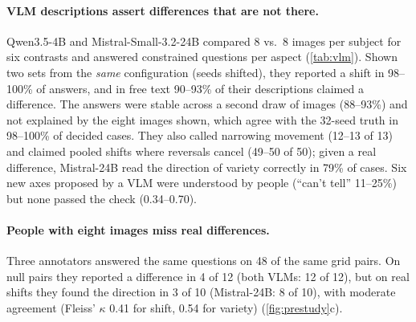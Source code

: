 \documentclass[review]{vgtc}                 %
\begin{document}
\paragraph{VLM descriptions assert differences that are not there.}
Qwen3.5-4B and Mistral-Small-3.2-24B compared 8 vs.\ 8 images per subject for six contrasts and answered constrained questions per aspect (\cref{tab:vlm}). Shown two sets from the \emph{same} configuration (seeds shifted), they reported a shift in 98--100\% of answers, and in free text 90--93\% of their descriptions claimed a difference. The answers were stable across a second draw of images (88--93\%) and not explained by the eight images shown, which agree with the 32-seed truth in 98--100\% of decided cases. They also called narrowing movement (12--13 of 13) and claimed pooled shifts where reversals cancel (49--50 of 50); given a real difference, Mistral-24B read the direction of variety correctly in 79\% of cases. Six new axes proposed by a VLM were understood by people (``can't tell'' 11--25\%) but none passed the check (0.34--0.70).

\paragraph{People with eight images miss real differences.}
Three annotators answered the same questions on 48 of the same grid pairs. On null pairs they reported a difference in 4 of 12 (both VLMs: 12 of 12), but on real shifts they found the direction in 3 of 10 (Mistral-24B: 8 of 10), with moderate agreement (Fleiss' $\kappa$ 0.41 for shift, 0.54 for variety) (\cref{fig:prestudy}c).
\end{document}
